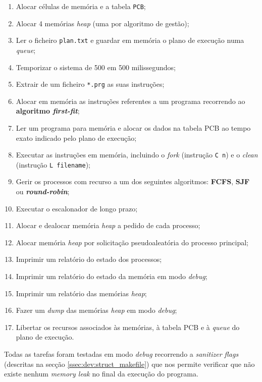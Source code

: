 \documentclass[10pt,oneside]{estiloUBI}
\begin{document}
	\begin{enumerate}
		\item Alocar células de memória e a tabela \texttt{\ac{PCB}};
		\item Alocar 4 memórias \textit{heap} (uma por algoritmo de gestão);
		\item Ler o ficheiro \texttt{plan.txt} e guardar em memória o plano de execução numa \textit{queue};
		\item Temporizar o sistema de 500 em 500 milissegundos;
		\item Extrair de um ficheiro \texttt{*.prg} as suas instruções;
		\item Alocar em memória as instruções referentes a um programa recorrendo ao \textbf{algoritmo \textit{first-fit}};
		\item Ler um programa para memória e alocar os dados na tabela \ac{PCB} ao tempo exato indicado pelo plano de execução;
		\item Executar as instruções em memória, incluindo o \textit{fork} (instrução \verb|C n|) e o \textit{clean} (instrução \verb|L filename|);
		\item Gerir os processos com recurso a um dos seguintes algoritmos: \textbf{\ac{FCFS}}, \textbf{\ac{SJF}} ou \textbf{\textit{round-robin}};
		\item Executar o escalonador de longo prazo;  %
		\item Alocar e dealocar memória \textit{heap} a pedido de cada processo;
		\item Alocar memória \textit{heap} por solicitação pseudoaleatória do processo principal;
		\item Imprimir um relatório do estado dos processos;
		\item Imprimir um relatório do estado da memória em modo \textit{debug};
		\item Imprimir um relatório das memórias \textit{heap};
		\item Fazer um \textit{dump} das memórias \textit{heap} em modo \textit{debug};
		\item Libertar os recursos associados às memórias, à tabela \ac{PCB} e à \textit{queue} do plano de execução.
	\end{enumerate}
	
	Todas as tarefas foram testadas em modo \textit{debug} recorrendo a \textit{sanitizer flags} (descritas na secção \ref{ssec:dev:struct_makefile}) que nos permite verificar que não existe nenhum \textit{memory leak} no final da execução do programa.
	
\end{document}
